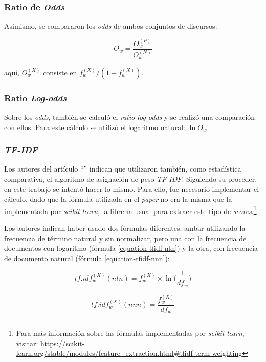 \subsubsection{Ratio de \textit{Odds}}
Asimismo, se compararon los \textit{odds} de ambos conjuntos de discursos:

\begin{equation}
    O_w = \frac{O_{w}^{(P)}}{O_{w}^{(N)}}
\end{equation}

aqu\'i, $O_{w}^{(X)}$ consiste en $f_{w}^{(X)}/(1-f_{w}^{(X)})$.

\subsubsection{Ratio \textit{Log-odds}}
Sobre los \textit{odds}, tambi\'en se calcul\'o el \textit{ratio log-odds} y
se realiz\'o una comparaci\'on con ellos. Para este c\'alculo se utiliz\'o el
logaritmo natural: $\ln{O_w}$

\subsubsection{\textit{TF-IDF}}
Los autores del art\'iculo ``'' indican
que utilizaron tambi\'en, como estad\'istica comparativa, el algoritmo de asignaci\'on
de peso \textit{TF-IDF}. Siguiendo su proceder, en este trabajo se intent\'o
hacer lo mismo. Para ello, fue necesario implementar el c\'alculo, dado que
la f\'ormula utilizada en el \textit{paper} no era la misma que la implementada
por \textit{scikit-learn}, la librer\'ia usual para extraer
este tipo de \textit{scores}.\footnote{Para m\'as informaci\'on sobre las f\'ormulas
implementadas por \textit{scikit-learn}, visitar:
\url{https://scikit-learn.org/stable/modules/feature_extraction.html\#tfidf-term-weighting}}\par
Los autores indican haber usado dos fórmulas diferentes: ambar utilizando la frecuencia
de término natural y sin normalizar, pero una con la frecuencia de documentos
con logaritmo (fórmula \ref{equation-tfidf-ntn}) y la otra, con frecuencia de documento
natural (fórmula \ref{equation-tfidf-nnn}):

\begin{equation}
\label{equation-tfidf-ntn}
    tf.idf_{w}^{(X)}(ntn) = f_{w}^{(X)} \times \ln\bigg({\frac{1}{df_{w}}}\bigg)
\end{equation}

\begin{equation}
\label{equation-tfidf-nnn}
    tf.idf_{w}^{(X)}(nnn) = \frac{f_{w}^{(X)}}{df_{w}}
\end{equation}

